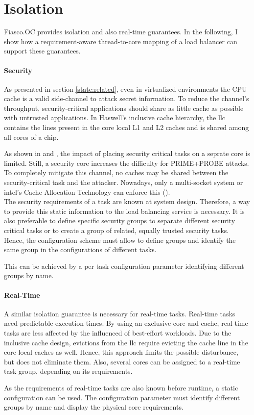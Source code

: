 \section{Isolation}
\label{design:isolation}

Fiasco.OC provides isolation and also real-time guarantees.
In the following, I show how a requirement-aware thread-to-core mapping of a
load balancer can support these guarantees.

\paragraph{Security}
As presented in section \ref{state:related}, even in virtualized environments
the CPU cache is a valid side-channel to attack secret information.
To reduce the channel's throughput, security-critical applications should share
as little cache as possible with untrusted applications.
In Haswell's inclusive cache hierarchy, the \gls{llc} contains the lines
present in the core local L1 and L2 caches and is shared among all cores of a
chip.

As shown in \cite{inci_seriously_2015} and \cite{liu_last-level_2015},
the impact of placing security critical tasks on a seprate core is limited.
Still, a security core increases the difficulty for PRIME+PROBE attacks.
To completely mitigate this channel, no caches may be shared between the
security-critical task and the attacker.
Nowadays, only a multi-socket system or \gls{intel}'s Cache Allocation
Technology can enforce this (\cite{intel_cat}).
\\

The security requirements of a task are known at system design.
Therefore, a way to provide this static information to the load balancing
service is necessary.
It is also preferable to define specific security groups to separate different
security critical tasks or to create a group of related, equally trusted
security tasks.
Hence, the configuration scheme must allow to define groups and identify the
same group in the configurations of different tasks.

This can be achieved by a per task configuration parameter identifying
different groups by name.


\paragraph{Real-Time}
A similar isolation guarantee is necessary for real-time tasks.
Real-time tasks need predictable execution times.
By using an exclusive core and cache, real-time tasks are less affected by the
influenced of best-effort workloads.
Due to the inclusive cache design, evictions from the \gls{llc} require
evicting the cache line in the core local caches as well.
Hence, this approach limits the possible disturbance, but does not eliminate them.
Also, several cores can be assigned to a real-time task group, depending on its
requirements.

As the requirements of real-time tasks are also known before runtime, a static
configuration can be used.
The configuration parameter must identify different groups by name
and display the physical core requirements.
